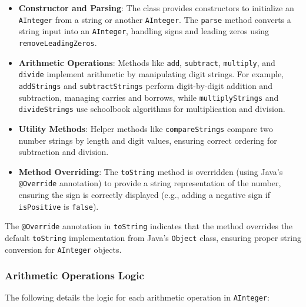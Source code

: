 \documentclass[a4paper,12pt]{article}
\begin{document}
\begin{itemize}
    \item \textbf{Constructor and Parsing}: The class provides constructors to initialize an \texttt{AInteger} from a string or another \texttt{AInteger}. The \texttt{parse} method converts a string input into an \texttt{AInteger}, handling signs and leading zeros using \texttt{removeLeadingZeros}.
    \item \textbf{Arithmetic Operations}: Methods like \texttt{add}, \texttt{subtract}, \texttt{multiply}, and \texttt{divide} implement arithmetic by manipulating digit strings. For example, \texttt{addStrings} and \texttt{subtractStrings} perform digit-by-digit addition and subtraction, managing carries and borrows, while \texttt{multiplyStrings} and \texttt{divideStrings} use schoolbook algorithms for multiplication and division.
    \item \textbf{Utility Methods}: Helper methods like \texttt{compareStrings} compare two number strings by length and digit values, ensuring correct ordering for subtraction and division.
    \item \textbf{Method Overriding}: The \texttt{toString} method is overridden (using Java's \texttt{@Override} annotation) to provide a string representation of the number, ensuring the sign is correctly displayed (e.g., adding a negative sign if \texttt{isPositive} is \texttt{false}).
\end{itemize}

The \texttt{@Override} annotation in \texttt{toString} indicates that the method overrides the default \texttt{toString} implementation from Java's \texttt{Object} class, ensuring proper string conversion for \texttt{AInteger} objects.

\subsubsection{Arithmetic Operations Logic}
The following details the logic for each arithmetic operation in \texttt{AInteger}:
\end{document}
